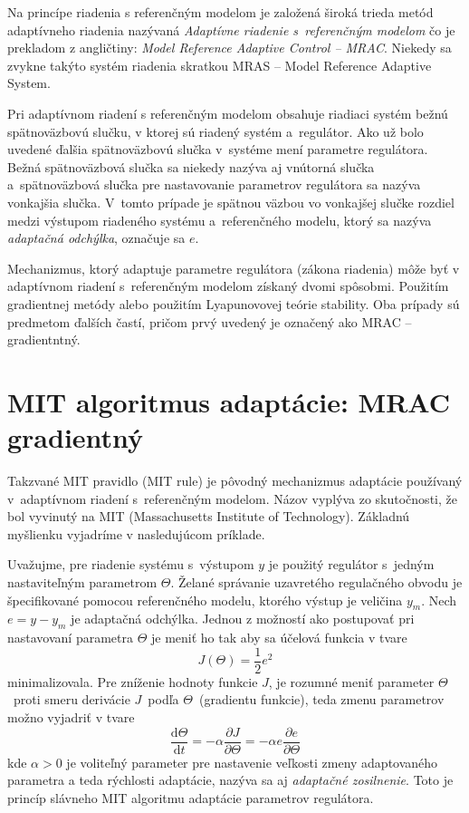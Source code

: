 \documentclass[a4paper, 10pt, ]{article}
\begin{document}
Na princípe riadenia s referenčným modelom je založená široká trieda metód adaptívneho riadenia nazývaná \emph{Adaptívne riadenie s~referenčným modelom} čo je prekladom z angličtiny: \emph{Model Reference Adaptive Control -- MRAC}. Niekedy sa zvykne takýto systém riadenia skratkou MRAS -- Model Reference Adaptive System.

Pri adaptívnom riadení s referenčným modelom obsahuje riadiaci systém bežnú spätnoväzbovú slučku, v ktorej sú riadený systém a~regulátor. Ako už bolo uvedené ďalšia spätnoväzbovú slučka v~systéme mení parametre regulátora. Bežná spätnoväzbová slučka sa niekedy nazýva aj vnútorná slučka a~spätnoväzbová slučka pre nastavovanie parametrov regulátora sa nazýva vonkajšia slučka. V~tomto prípade je spätnou väzbou vo vonkajšej slučke rozdiel medzi výstupom riadeného systému a~referenčného modelu, ktorý sa nazýva \emph{adaptačná odchýlka}, označuje sa $e$.

Mechanizmus, ktorý adaptuje parametre regulátora (zákona riadenia) môže byť v adaptívnom riadení s~referenčným modelom získaný dvomi spôsobmi. Použitím gradientnej metódy alebo použitím Lyapunovovej teórie stability. Oba prípady sú predmetom ďalších častí, pričom prvý uvedený je označený ako MRAC -- gradientntný.









\section{MIT algoritmus adaptácie: MRAC gradientný}



Takzvané MIT pravidlo (MIT rule) je pôvodný mechanizmus adaptácie používaný v~adaptívnom riadení s~referenčným modelom. Názov vyplýva zo skutočnosti, že bol vyvinutý na MIT (Massachusetts Institute of Technology). Základnú myšlienku vyjadríme v nasledujúcom príklade.

Uvažujme, pre riadenie systému s~výstupom $y$ je použitý regulátor s~jedným nastaviteľným parametrom $\Theta$. Želané správanie uzavretého regulačného obvodu je špecifikované pomocou referenčného modelu, ktorého výstup je veličina $y_m$. Nech $e = y - y_m$ je adaptačná odchýlka. Jednou z možností ako postupovať pri nastavovaní parametra $\Theta$ je meniť ho tak aby sa účelová funkcia v tvare
\begin{equation}
	J(\Theta) = \frac{1}{2} e^2
\end{equation}
minimalizovala. Pre zníženie hodnoty funkcie $J$, je rozumné meniť parameter $\Theta$~proti smeru derivácie $J$~podľa $\Theta$~(gradientu funkcie), teda zmenu parametrov možno vyjadriť v tvare
\begin{equation}
	\frac{\text{d}\Theta}{\text{d}t} = - \alpha \frac{\partial J}{\partial \Theta} = - \alpha e \frac{\partial e}{\partial \Theta}
\end{equation}
kde $\alpha > 0$ je voliteľný parameter pre nastavenie veľkosti zmeny adaptovaného parametra a teda rýchlosti adaptácie, nazýva sa aj \emph{adaptačné zosilnenie}. Toto je princíp slávneho MIT algoritmu adaptácie parametrov regulátora.
\end{document}
